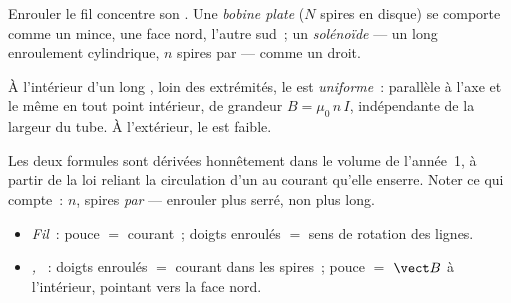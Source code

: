 \begin{definition}\label{def:g11:magnetic-fields:solenoid}
Enrouler le fil concentre son
. Une \emph{bobine
plate} ($N$ spires en disque) se comporte comme un
 mince, une face
nord, l'autre sud~; un \emph{solénoïde} --- un long
enroulement cylindrique, $n$ spires par
 --- comme un
 droit.
\end{definition}

\begin{proposition}\label{prop:g11:magnetic-fields:solenoidfield}
À l'intérieur d'un long , loin des
extrémités, le  est
\emph{uniforme}~: parallèle à l'axe et le même en tout point
intérieur, de grandeur $B = \mu_0\, n\, I$, indépendante de la largeur
du tube. À l'extérieur, le
 est faible.
\end{proposition}
\admitted

\begin{remark}
Les deux formules sont dérivées honnêtement dans le volume de
l'année~1, à partir de la loi reliant la circulation d'un
 au courant qu'elle enserre.
Noter ce qui compte~: $n$, spires \emph{par
} --- enrouler plus serré, non plus
long.
\end{remark}

\begin{method}\label{met:g11:magnetic-fields:righthand}
\begin{itemize}
  \item \emph{Fil}~: pouce $=$ courant~; doigts enroulés $=$ sens de
        rotation des lignes.
  \item \emph{,
        }~: doigts enroulés $=$
        courant dans les spires~; pouce $=$ $\vect B$ à l'intérieur,
        pointant vers la face nord.
\end{itemize}
\end{method}

